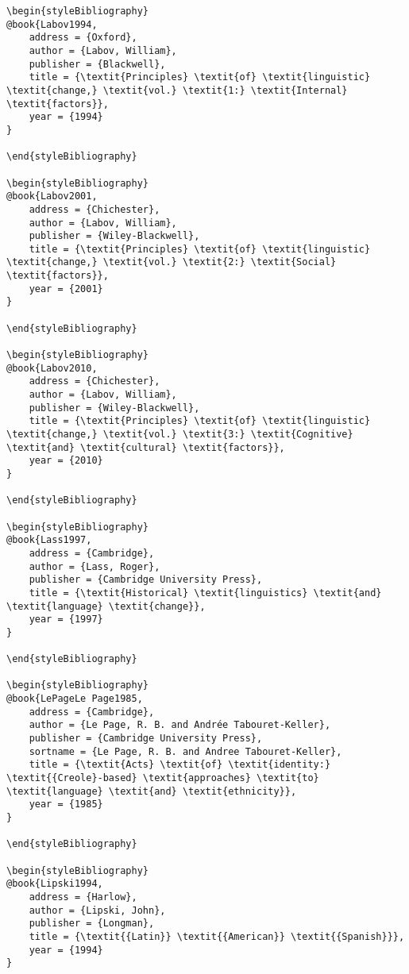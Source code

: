 \documentclass[output=paper]{langsci/langscibook}
\begin{document}
\begin{verbatim}
\begin{styleBibliography}
@book{Labov1994,
	address = {Oxford},
	author = {Labov, William},
	publisher = {Blackwell},
	title = {\textit{Principles} \textit{of} \textit{linguistic} \textit{change,} \textit{vol.} \textit{1:} \textit{Internal} \textit{factors}},
	year = {1994}
}

\end{styleBibliography}

\begin{styleBibliography}
@book{Labov2001,
	address = {Chichester},
	author = {Labov, William},
	publisher = {Wiley-Blackwell},
	title = {\textit{Principles} \textit{of} \textit{linguistic} \textit{change,} \textit{vol.} \textit{2:} \textit{Social} \textit{factors}},
	year = {2001}
}

\end{styleBibliography}

\begin{styleBibliography}
@book{Labov2010,
	address = {Chichester},
	author = {Labov, William},
	publisher = {Wiley-Blackwell},
	title = {\textit{Principles} \textit{of} \textit{linguistic} \textit{change,} \textit{vol.} \textit{3:} \textit{Cognitive} \textit{and} \textit{cultural} \textit{factors}},
	year = {2010}
}

\end{styleBibliography}

\begin{styleBibliography}
@book{Lass1997,
	address = {Cambridge},
	author = {Lass, Roger},
	publisher = {Cambridge University Press},
	title = {\textit{Historical} \textit{linguistics} \textit{and} \textit{language} \textit{change}},
	year = {1997}
}

\end{styleBibliography}

\begin{styleBibliography}
@book{LePageLe Page1985,
	address = {Cambridge},
	author = {Le Page, R. B. and Andrée Tabouret-Keller},
	publisher = {Cambridge University Press},
	sortname = {Le Page, R. B. and Andree Tabouret-Keller},
	title = {\textit{Acts} \textit{of} \textit{identity:} \textit{{Creole}-based} \textit{approaches} \textit{to} \textit{language} \textit{and} \textit{ethnicity}},
	year = {1985}
}

\end{styleBibliography}

\begin{styleBibliography}
@book{Lipski1994,
	address = {Harlow},
	author = {Lipski, John},
	publisher = {Longman},
	title = {\textit{{Latin}} \textit{{American}} \textit{{Spanish}}},
	year = {1994}
}


\end{verbatim}
\end{document}
